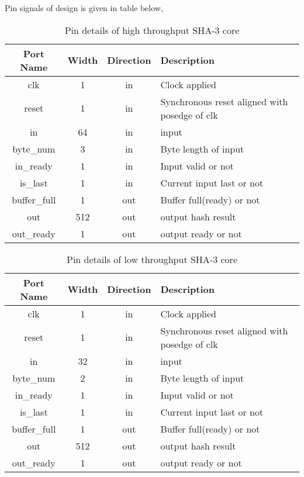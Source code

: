 Pin signals of design is given in table below,


\begingroup
\fontsize{10pt}{12pt}\selectfont
\begin{table}[ht]
	\centering
	
\begin{tabulary}{1.0\textwidth}{|C||C|C|L|}
\hline
 Port Name & Width & Direction & Description  \\ \hline
 clk & 1 & in & Clock applied  \\ \hline
 reset & 1 & in & Synchronous reset aligned with posedge of clk  \\ \hline
 in & 64 & in & input  \\ \hline
 byte\_num & 3 & in & Byte length of input \\ \hline
 in\_ready & 1 & in & Input valid or not  \\ \hline
 is\_last & 1 & in & Current input last or not  \\ \hline
 buffer\_full & 1 & out & Buffer full(ready) or not  \\ \hline
 out & 512 & out & output hash result  \\ \hline
 out\_ready & 1 & out & output ready or not  \\ \hline
\end{tabulary}
\caption{Pin details of high throughput SHA-3 core}
\label{table:3}
\end{table}
\endgroup


\makeatletter%
\setlength{\@fptop}{5pt}
\makeatother

\begingroup
\fontsize{10pt}{12pt}\selectfont

\begin{table}[ht]
	\centering
\begin{tabulary}{1.0\textwidth}{|C||C|C|L|} 
\hline
 Port Name & Width & Direction & Description  \\ \hline
 clk & 1 & in & Clock applied  \\ \hline
 reset & 1 & in & Synchronous reset aligned with posedge of clk  \\ \hline
 in & 32 & in & input  \\ \hline
 byte\_num & 2 & in & Byte length of input \\ \hline
 in\_ready & 1 & in & Input valid or not  \\ \hline
 is\_last & 1 & in & Current input last or not  \\ \hline
 buffer\_full & 1 & out & Buffer full(ready) or not  \\ \hline
 out & 512 & out & output hash result  \\ \hline
 out\_ready & 1 & out & output ready or not  \\ \hline
\end{tabulary}
\caption{Pin details of low throughput SHA-3 core}
\label{table:4}
\end{table}
\endgroup

